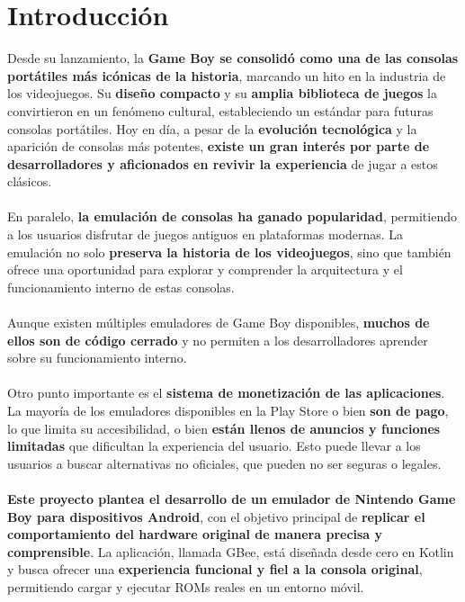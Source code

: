 \chapter{Introducción}
Desde su lanzamiento, la \textbf{Game Boy se consolidó como una de las consolas portátiles más icónicas de la historia}, marcando un hito en la industria de los videojuegos. Su \textbf{diseño compacto} y su \textbf{amplia biblioteca de juegos} la convirtieron en un fenómeno cultural, estableciendo un estándar para futuras consolas portátiles. Hoy en día, a pesar de la \textbf{evolución tecnológica} y la aparición de consolas más potentes, \textbf{existe un gran interés por parte de desarrolladores y aficionados en revivir la experiencia} de jugar a estos clásicos.
\\\\
En paralelo, \textbf{la emulación de consolas ha ganado popularidad}, permitiendo a los usuarios disfrutar de juegos antiguos en plataformas modernas. La emulación no solo \textbf{preserva la historia de los videojuegos}, sino que también ofrece una oportunidad para explorar y comprender la arquitectura y el funcionamiento interno de estas consolas.
\\\\
Aunque existen múltiples emuladores de Game Boy disponibles, \textbf{muchos de ellos son de código cerrado} y no permiten a los desarrolladores aprender sobre su funcionamiento interno.
\\\\
Otro punto importante es el \textbf{sistema de monetización de las aplicaciones}. La mayoría de los emuladores disponibles en la Play Store o bien \textbf{son de pago}, lo que limita su accesibilidad, o bien \textbf{están llenos de anuncios y funciones limitadas} que dificultan la experiencia del usuario. Esto puede llevar a los usuarios a buscar alternativas no oficiales, que pueden no ser seguras o legales.
\\\\
\textbf{Este proyecto plantea el desarrollo de un emulador de Nintendo Game Boy para dispositivos Android}, con el objetivo principal de \textbf{replicar el comportamiento del hardware original de manera precisa y comprensible}. La aplicación, llamada GBee, está diseñada desde cero en Kotlin y busca ofrecer una \textbf{experiencia funcional y fiel a la consola original}, permitiendo cargar y ejecutar ROMs reales en un entorno móvil.
